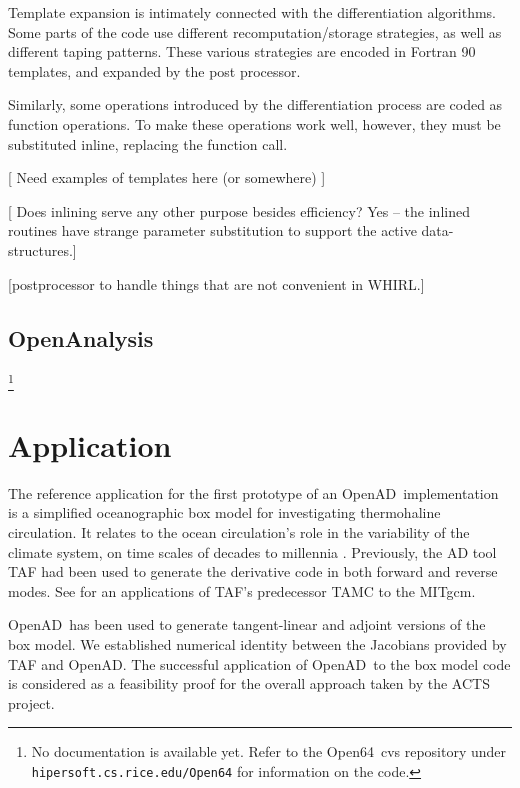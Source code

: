 \documentclass[acmtocl,acmnow]{acmtrans2m}
\newcommand{\OpenAD}{OpenAD}
\newcommand{\OpenSixtyFour}{Open64}
\newcommand{\OpenAnalysis}{OpenAnalysis}
\begin{document}
Template expansion is intimately connected with the differentiation
algorithms. Some parts of the code use different recomputation/storage
strategies, as well as different taping patterns. These various
strategies are encoded in Fortran 90 templates, and expanded by the
post processor.

Similarly, some operations introduced by the differentiation process
are coded as function operations. To make these operations work well,
however, they must be substituted inline, replacing the function call.

[ Need examples of templates here (or somewhere) ]

[ Does inlining serve any other purpose besides efficiency?  Yes --
the inlined routines have strange parameter substitution to support
the active data-structures.]

[postprocessor to handle things that are not convenient in WHIRL.]


\subsection{\OpenAnalysis} 

\footnote{No documentation is available yet.  Refer to the
\OpenSixtyFour\ cvs repository under {\tt
hipersoft.cs.rice.edu/Open64} for information on the code.}

\section{Application}

The reference application for the first prototype of an \OpenAD\ implementation
is a simplified oceanographic box model for investigating
thermohaline circulation. It relates to the
ocean circulation's role in the variability of the climate system,
on time scales of decades to millennia \cite{tzi-ioa:02}.
Previously, the AD tool TAF \cite{GiKa02} 
had been used to generate the derivative
code in both forward and reverse modes.
See \cite{maro-eta:99} for an applications of
TAF's predecessor TAMC to the MITgcm.

\OpenAD\ has been used to generate tangent-linear and 
adjoint versions of the box model. We established numerical identity between
the Jacobians provided by TAF and \OpenAD.
The successful 
application of \OpenAD\ to the box model code is considered as a feasibility 
proof for the overall approach taken by the ACTS project.  
\end{document}
